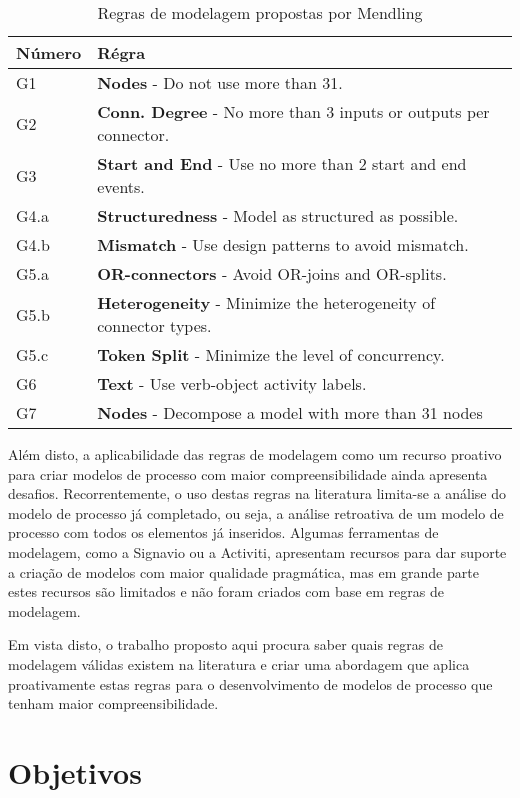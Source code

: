 \documentclass[12pt]{article}
\begin{document}
	\begin{table}
		\begin{tabularx}{\textwidth}{l X}\label{7PMG}
			Número & Régra\\\hline
			G1 & \textbf{Nodes} - Do not use more than 31.\\
			G2 & \textbf{Conn. Degree} - No more than 3 inputs or outputs per connector.\\
			G3 & \textbf{Start and End} - Use no more than 2 start and end events.\\
			G4.a & \textbf{Structuredness} - Model as structured as possible.\\
			G4.b & \textbf{Mismatch} - Use design patterns to avoid mismatch.\\
			G5.a & \textbf{OR-connectors} - Avoid OR-joins and OR-splits.\\
			G5.b & \textbf{Heterogeneity} - Minimize the heterogeneity of connector types.\\
			G5.c & \textbf{Token Split} - Minimize the level of concurrency.\\
			G6 & \textbf{Text} - Use verb-object activity labels.\\
			G7 & \textbf{Nodes} - Decompose a model with more than 31 nodes\\
		\end{tabularx}
		\caption{Regras de modelagem propostas por Mendling \cite{Mendling2013}}
	\end{table}


Além disto, a aplicabilidade das regras de modelagem como um recurso proativo para criar modelos de processo com maior compreensibilidade ainda apresenta desafios. Recorrentemente, o uso destas regras na literatura limita-se a análise do modelo de processo já completado, ou seja, a análise retroativa de um modelo de processo com todos os elementos já inseridos. Algumas ferramentas de modelagem, como a Signavio ou a Activiti, apresentam recursos para dar suporte a criação de modelos com maior qualidade pragmática, mas em grande parte estes recursos são limitados e não foram criados com base em regras de modelagem.

Em vista disto, o trabalho proposto aqui procura saber quais regras de modelagem válidas existem na literatura e criar uma abordagem que aplica proativamente estas regras para o desenvolvimento de modelos de processo que tenham maior compreensibilidade.

\newpage
\section{Objetivos}
\end{document}
